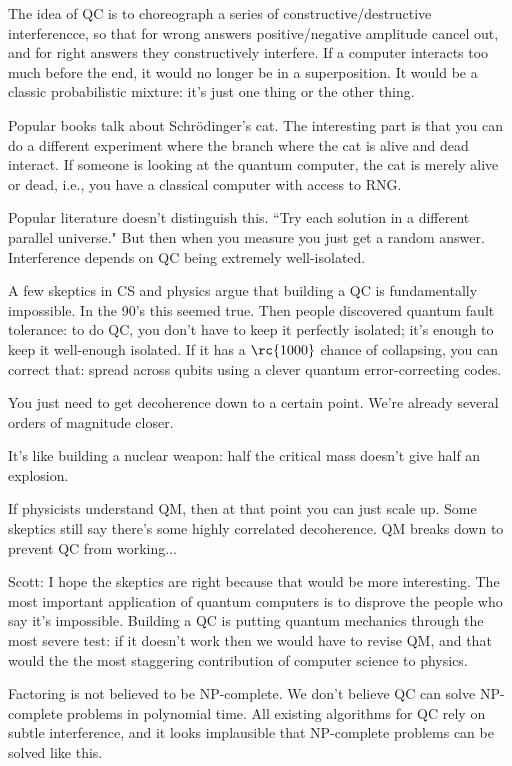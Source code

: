 The idea of QC is to choreograph a series of constructive/destructive interferencce, so that for wrong answers positive/negative amplitude cancel out, and for right answers they constructively interfere. If a computer interacts too much before the end, it would no longer be in a superposition. It would be a classic probabilistic mixture: it's just one thing or the other thing. 

Popular books talk about Schr\"odinger's cat. The interesting part is that you can do a different experiment where the branch where the cat is alive and dead interact. %
If someone is looking at the quantum computer, the cat is merely alive or dead, i.e., you have a classical computer with access to RNG.

Popular literature doesn't distinguish this. ``Try each solution in a different parallel universe." But then when you measure you just get a random answer. Interference depends on QC being extremely well-isolated.

A few skeptics in CS and physics argue that building a QC is fundamentally impossible. In the 90's this seemed true. Then people discovered quantum fault tolerance: to do QC, you don't have to keep it perfectly isolated; it's enough to keep it well-enough isolated. If it has a $\rc{1000}$ chance of collapsing, you can correct that: spread across qubits using a clever quantum error-correcting codes.

You just need to get decoherence down to a certain point. We're already several orders of magnitude closer.

It's like building a nuclear weapon: half the critical mass doesn't give half an explosion.

If physicists understand QM, then at that point you can just scale up. Some skeptics still say there's some highly correlated decoherence. QM breaks down to prevent QC from working...

Scott: I hope the skeptics are right because that would be more interesting. The most important application of quantum computers is to disprove the people who say it's impossible. Building a QC is putting quantum mechanics through the most severe test: if it doesn't work then we would have to revise QM, and that would the the most staggering contribution of computer science to physics.

Factoring is not believed to be NP-complete. We don't believe QC can solve NP-complete problems in polynomial time. All existing algorithms for QC rely on subtle interference, and it looks implausible that NP-complete problems can be solved like this.

